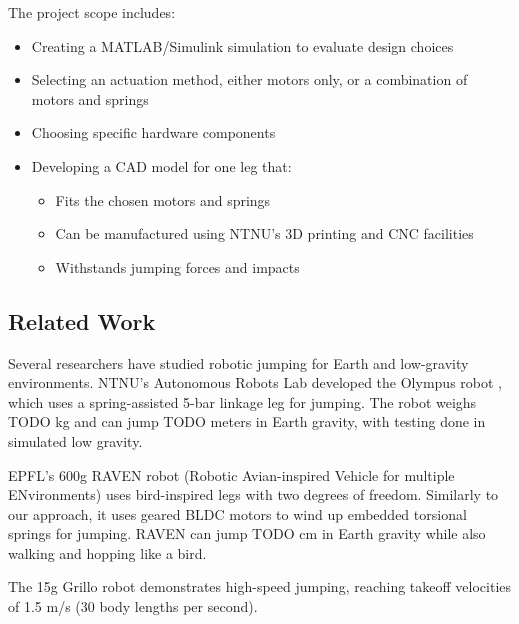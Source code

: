 The project scope includes:
\begin{itemize}
    \item Creating a MATLAB/Simulink simulation to evaluate design choices
    \item Selecting an actuation method, either motors only, or a combination of motors and springs
    \item Choosing specific hardware components
    \item Developing a CAD model for one leg that:
    \begin{itemize}
        \item Fits the chosen motors and springs
        \item Can be manufactured using NTNU's 3D printing and CNC facilities
        \item Withstands jumping forces and impacts
    \end{itemize}
\end{itemize}

\subsection{Related Work}
\label{sec:related_work}

Several researchers have studied robotic jumping for Earth and low-gravity environments. NTNU's Autonomous Robots Lab developed the Olympus robot \cite{OLYMPUS1} \cite{OLYMPUS2}, which uses a spring-assisted 5-bar linkage leg for jumping. The robot weighs TODO kg and can jump TODO meters in Earth gravity, with testing done in simulated low gravity.

EPFL's 600g RAVEN robot (Robotic Avian-inspired Vehicle for multiple ENvironments) \cite{RAVEN} uses bird-inspired legs with two degrees of freedom. Similarly to our approach, it uses geared BLDC motors to wind up embedded torsional springs for jumping. RAVEN can jump TODO cm in Earth gravity while also walking and hopping like a bird.

The 15g Grillo robot \cite{GRILLO} demonstrates high-speed jumping, reaching takeoff velocities of 1.5 m/s (30 body lengths per second).